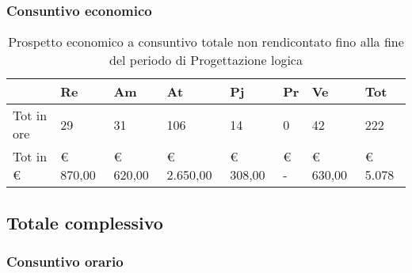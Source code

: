 		\subsubsection{Consuntivo economico}
						\begin{table}[H] \begin{center} \begin{tabular}{llllllll}
						\toprule
							&	\textbf{Re}	&	\textbf{Am}	&	\textbf{At}	&	\textbf{Pj}	&	\textbf{Pr}	&	\textbf{Ve}	&	\textbf{Tot}\\
			
						\midrule
						Tot in ore	&	29		&	31		&	106	&	14		&	0		&	42		&	222	 \\ 	
																												
						Tot in €	&	 € 870,00 		 & 	 €  620,00 		 & 	 € 2.650,00 		 & 	 €  308,00 		 & 	 €           -   		 & 	 €  630,00 		 & 	 €    5.078 	 \\ 
						\bottomrule
						\end{tabular} \end{center} \caption{Prospetto economico a consuntivo totale non rendicontato fino alla fine del periodo di																						
												Progettazione logica				
						}\label{tab:s_TotaleNonRendicontato} \end{table}
	
	\newpage
	\subsection{Totale complessivo}
		\subsubsection{Consuntivo orario}

